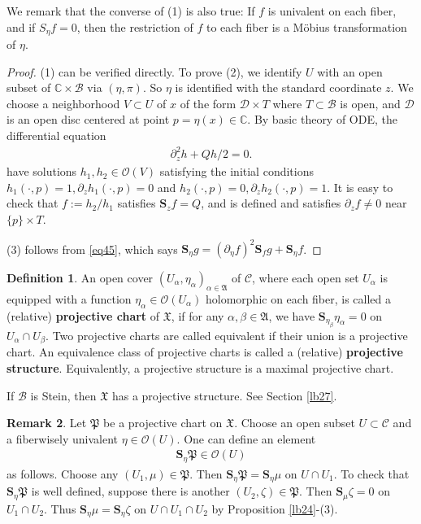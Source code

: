 \documentclass[11pt,b5paper,notitlepage]{article}
\theoremstyle{definition}
\newtheorem{df}{Definition}[section]
\newtheorem{rem}[df]{Remark}
\theoremstyle{plain}
\newcommand{\fk}{\mathfrak}
\newcommand{\mc}{\mathcal}
\newcommand{\scr}{\mathscr}
\newcommand{\Cbb}{\mathbb C}
\newcommand{\Sbf}{\mathbf{S}}
\numberwithin{equation}{section}
\begin{document}
We remark that the converse of (1) is also true: If $f$ is univalent on each fiber, and if $S_\eta f=0$, then the restriction of $f$ to each fiber is a M\"obius transformation of $\eta$.

\begin{proof}
(1) can be verified directly. To prove (2), we identify $U$ with an open subset of $\Cbb\times\mc B$ via $(\eta,\pi)$. So $\eta$ is identified with the standard coordinate $z$. We choose a neighborhood $V\subset U$ of $x$ of the form $\mc D\times T$ where $T\subset\mc B$ is open, and $\mc D$ is an open disc centered at point $p=\eta(x)\in\Cbb$. By basic theory of ODE, the  differential equation
	\begin{align*}
	\partial_z^2h+Qh/2=0.
	\end{align*}
have solutions $h_1,h_2\in\scr O(V)$ satisfying  the initial conditions $h_1(\cdot,p)=1,\partial_z h_1(\cdot,p)=0$ and $h_2(\cdot,p)=0,\partial_z h_2(\cdot,p)=1$. It is easy to check that $f:=h_2/h_1$ satisfies $\Sbf_z f=Q$, and is defined and satisfies $\partial_zf\neq 0$ near $\{p\}\times T$.
	
(3) follows from \eqref{eq45}, which says $\Sbf_\eta g=(\partial_\eta f)^2\Sbf_fg+\Sbf_\eta f$. 
\end{proof}



\begin{df}
	An open cover $(U_\alpha,\eta_\alpha)_{\alpha\in\fk A}$ of $\mc C$, where each open set $U_\alpha$ is equipped with a function $\eta_\alpha\in\scr O(U_\alpha)$ holomorphic on each fiber, is called a (relative) \textbf{projective chart} of $\fk X$, if for any $\alpha,\beta\in\fk A$, we have $\Sbf_{\eta_\beta}\eta_\alpha=0$ on $U_\alpha\cap U_\beta$. Two projective charts are called equivalent if their union is a projective chart. An equivalence class of projective charts is called a (relative) \textbf{projective structure}. Equivalently, a projective structure is a maximal projective chart.
\end{df}


If $\mc B$ is Stein, then $\fk X$ has a projective structure. See Section \ref{lb27}.



\begin{rem}\label{lb25}
	Let $\fk P$ be a projective chart on $\fk X$. Choose an open subset $U\subset\mc C$ and a fiberwisely univalent $\eta\in\scr O(U)$. One can \index{S@$\Sbf_\eta f,\Sbf_\eta\fk P$} define an element 
	\begin{align*}
	\Sbf_\eta\fk P\in \scr O(U)
	\end{align*}
	as follows. Choose any $(U_1,\mu)\in\fk P$. Then $\Sbf_\eta\fk P=\Sbf_\eta\mu$ on $U\cap U_1$. To check that $\Sbf_\eta\fk P$ is well defined, suppose there is another $(U_2,\zeta)\in\fk P$. Then $\Sbf_\mu\zeta=0$ on $U_1\cap U_2$. Thus $\Sbf_\eta\mu=\Sbf_\eta\zeta$ on $U\cap U_1\cap U_2$ by Proposition \ref{lb24}-(3).
\end{rem}
\end{document}
